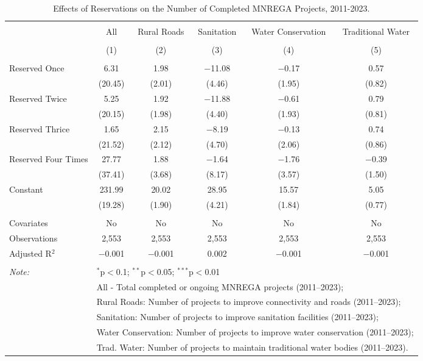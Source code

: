 
\begin{table}[!htbp] \centering 
  \caption{Effects of Reservations on the Number of Completed MNREGA Projects, 2011-2023.} 
  \label{main_mnrega_2011_2023_dosage} 
\scriptsize 
\begin{tabular}{@{\extracolsep{5pt}}lccccc} 
\\[-1.8ex]\hline 
\hline \\[-1.8ex] 
 & All & Rural Roads & Sanitation & Water Conservation & Traditional Water \\ 
\\[-1.8ex] & (1) & (2) & (3) & (4) & (5)\\ 
\hline \\[-1.8ex] 
 Reserved Once & 6.31 & 1.98 & $-$11.08 & $-$0.17 & 0.57 \\ 
  & (20.45) & (2.01) & (4.46) & (1.95) & (0.82) \\ 
  Reserved Twice & 5.25 & 1.92 & $-$11.88 & $-$0.61 & 0.79 \\ 
  & (20.15) & (1.98) & (4.40) & (1.93) & (0.81) \\ 
  Reserved Thrice & 1.65 & 2.15 & $-$8.19 & $-$0.13 & 0.74 \\ 
  & (21.52) & (2.12) & (4.70) & (2.06) & (0.86) \\ 
  Reserved Four Times & 27.77 & 1.88 & $-$1.64 & $-$1.76 & $-$0.39 \\ 
  & (37.41) & (3.68) & (8.17) & (3.57) & (1.50) \\ 
  Constant & 231.99 & 20.02 & 28.95 & 15.57 & 5.05 \\ 
  & (19.28) & (1.90) & (4.21) & (1.84) & (0.77) \\ 
 \hline \\[-1.8ex] 
Covariates & No & No & No & No & No \\ 
Observations & 2,553 & 2,553 & 2,553 & 2,553 & 2,553 \\ 
Adjusted R$^{2}$ & $-$0.001 & $-$0.001 & 0.002 & $-$0.001 & $-$0.001 \\ 
\hline 
\hline \\[-1.8ex] 
\textit{Note:}  & \multicolumn{5}{l}{$^{*}$p$<$0.1; $^{**}$p$<$0.05; $^{***}$p$<$0.01} \\ 
 & \multicolumn{5}{l}{All - Total completed or ongoing MNREGA projects (2011--2023);} \\ 
 & \multicolumn{5}{l}{Rural Roads: Number of projects to improve connectivity and roads (2011--2023);} \\ 
 & \multicolumn{5}{l}{Sanitation:  Number of projects to improve sanitation facilities  (2011--2023);} \\ 
 & \multicolumn{5}{l}{Water Conservation: Number of projects to improve water conservation (2011--2023);} \\ 
 & \multicolumn{5}{l}{Trad. Water: Number of projects to maintain traditional water bodies (2011--2023).} \\ 
\end{tabular} 
\end{table} 

